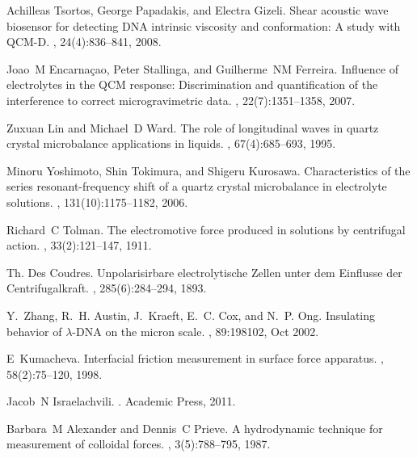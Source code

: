 \documentclass[floatfix,superscriptaddress,a4paper,twocolumn]{revtex4-1}
\begin{document}
\begin{thebibliography}{10}
  Achilleas Tsortos, George Papadakis, and Electra Gizeli.
  \newblock Shear acoustic wave biosensor for detecting {DNA} intrinsic viscosity
  and conformation: A study with {QCM-D}.
  , 24(4):836--841, 2008.

  Joao~M Encarna\c{c}ao, Peter Stallinga, and Guilherme~NM Ferreira.
  \newblock Influence of electrolytes in the {QCM} response: Discrimination and
  quantification of the interference to correct microgravimetric data.
  , 22(7):1351--1358, 2007.

  Zuxuan Lin and Michael~D Ward.
  \newblock The role of longitudinal waves in quartz crystal microbalance
  applications in liquids.
  , 67(4):685--693, 1995.

  Minoru Yoshimoto, Shin Tokimura, and Shigeru Kurosawa.
  \newblock Characteristics of the series resonant-frequency shift of a quartz
  crystal microbalance in electrolyte solutions.
  , 131(10):1175--1182, 2006.

  Richard~C Tolman.
  \newblock The electromotive force produced in solutions by centrifugal action.
  , 33(2):121--147, 1911.

  Th. {Des Coudres}.
  \newblock Unpolarisirbare electrolytische {Z}ellen unter dem {E}influsse der
    {C}entrifugalkraft.
  , 285(6):284--294, 1893.

  Y.~Zhang, R.~H. Austin, J.~Kraeft, E.~C. Cox, and N.~P. Ong.
  \newblock Insulating behavior of $\lambda$-{DNA} on the micron scale.
  , 89:198102, Oct 2002.

  E~Kumacheva.
  \newblock Interfacial friction measurement in surface force apparatus.
  , 58(2):75--120, 1998.

  Jacob~N Israelachvili.
  .
  \newblock Academic Press, 2011.

  Barbara~M Alexander and Dennis~C Prieve.
  \newblock A hydrodynamic technique for measurement of colloidal forces.
  , 3(5):788--795, 1987.


\end{thebibliography}
\end{document}
